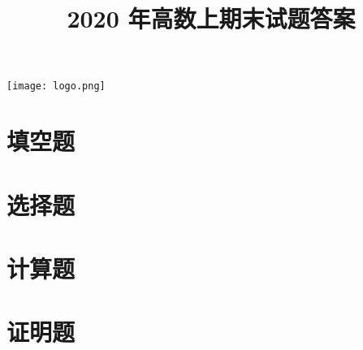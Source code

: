 \documentclass[cn,hazy,blue,12pt,normal, math=newtx]{elegantnote}
\title{2020 年高数上期末试题答案}
\author{}
\institute{彭康学导团}
\date{\zhtoday}
\begin{document}
\maketitle

\centerline{
  \texttt{[image: logo.png]}
}
\section{填空题}





\section{选择题}





\section{计算题}








\section{证明题}



\end{document}
